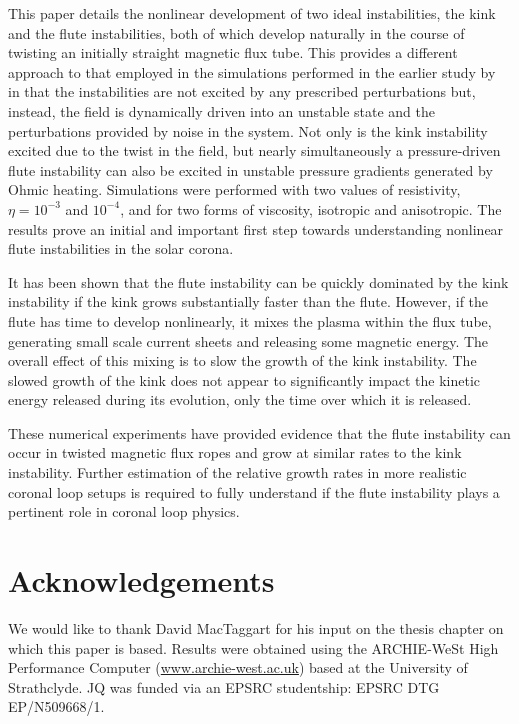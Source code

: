 \documentclass[fleqn,usenatbib]{mnras}
\newcommand{\revcite}[1]{{\color{red} \underline{#1}}}
\begin{document}
This paper details the nonlinear development of two ideal instabilities, the
kink and the flute instabilities, both of which develop naturally in the course
of twisting an initially straight magnetic flux tube. This provides a different
approach to that employed in the simulations performed in the earlier
study by ~\revcite{\citet{quinnEffectAnisotropicViscosity2020}} in that the instabilities are
not excited by any prescribed perturbations but, instead, the field is
dynamically driven into an unstable state and the perturbations provided by
noise in the system. Not only is the kink instability excited due to the twist
in the field, but nearly simultaneously a pressure-driven flute instability can
also be excited in unstable pressure gradients generated by Ohmic heating.
Simulations were performed with two values of resistivity, $\eta=10^{-3}$ and
$10^{-4}$, and for two forms of viscosity, isotropic and anisotropic. The
results prove an initial and important first step towards understanding
nonlinear flute instabilities in the solar corona.  

It has been shown that the flute instability can be quickly dominated by the
kink instability if the kink grows substantially faster than the flute.
However, if the flute has time to develop nonlinearly, it mixes the plasma
within the flux tube, generating small scale current sheets and releasing some
magnetic energy. The overall effect of this mixing is to slow the growth of the
kink instability. The slowed growth of the kink does not appear to
significantly impact the kinetic energy released during its evolution, only the
time over which it is released. 

These numerical experiments have provided evidence that the flute instability
can occur in twisted magnetic flux ropes and grow at similar rates to the kink
instability. Further estimation of the relative growth rates in more realistic
coronal loop setups is required to fully understand if the flute instability
plays a pertinent role in coronal loop physics.

\section*{Acknowledgements}

We would like to thank David MacTaggart for his input on the thesis chapter on
which this paper is based. Results were obtained using the ARCHIE-WeSt High
Performance Computer (\url{www.archie-west.ac.uk}) based at the University of
Strathclyde. JQ was funded via an EPSRC studentship: EPSRC DTG EP/N509668/1.
\end{document}
